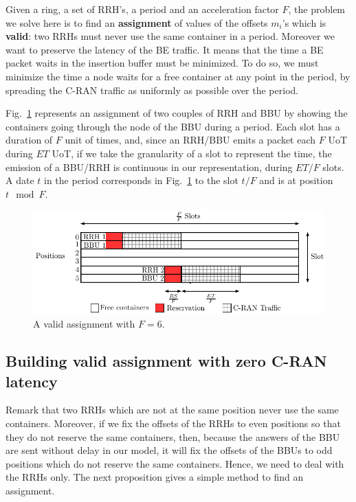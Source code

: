 \documentclass[10pt, conference, letterpaper]{IEEEtran}
\begin{document}
Given a ring, a set of RRH's, a period and an acceleration factor $F$, the problem we solve here is to find an \textbf{assignment} of values of the offsets $m_i$'s which is \textbf{valid}: two RRHs must never use the same container in a period. Moreover we want to preserve the latency of the BE traffic. It means that the time a BE packet waits in the insertion buffer must be minimized. To do so, we must minimize the time a node waits for a free container at any point in the period, by spreading the C-RAN traffic as uniformly as possible over the period. %

Fig.~\ref{fig:assignment} represents an assignment of two couples of RRH and BBU by showing the containers going through the node of the BBU during a period. Each slot has a duration of $F$ unit of times, and, since an RRH/BBU emits a packet each $F$ UoT during $ET$ UoT, if we take the granularity of a slot to represent the time, the emission of a BBU/RRH is continuous in our representation, during $ET/F$ slots. A date $t$ in the period corresponds in Fig.~\ref{fig:assignment} to the slot $t/F$ and is at position $t \mod F$.

   \vspace{-0,5cm}
\begin{figure}[h!]
\begin{center}   

      \includegraphics[scale=0.65]{assignment}
     \caption{A valid assignment with $F = 6$.}\label{fig:assignment}
     
\end{center}
  \end{figure}
     \vspace{-0.75cm}

 \subsection{Building valid assignment with zero C-RAN latency}\label{sec:zerolatency}
Remark that two RRHs which are not at the same position never use the same containers. Moreover, if we fix the offsets of the RRHs to even positions so that they do not reserve the same containers, then, because the answers of the BBU are sent without delay in our model, it will fix the offsets of the BBUs to odd positions which do not reserve the same containers. Hence, we need to deal with the RRHs only.
The next proposition gives a simple method to find an assignment.
\end{document}

